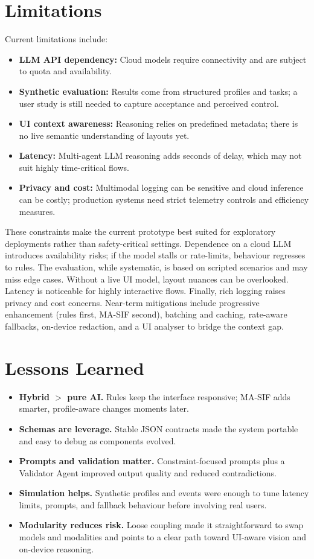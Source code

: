 \section{Limitations}
Current limitations include:
\begin{itemize}
    \item \textbf{LLM API dependency:} Cloud models require connectivity and are subject to quota and availability.
    \item \textbf{Synthetic evaluation:} Results come from structured profiles and tasks; a user study is still needed to capture acceptance and perceived control.
    \item \textbf{UI context awareness:} Reasoning relies on predefined metadata; there is no live semantic understanding of layouts yet.
    \item \textbf{Latency:} Multi-agent LLM reasoning adds seconds of delay, which may not suit highly time-critical flows.
    \item \textbf{Privacy and cost:} Multimodal logging can be sensitive and cloud inference can be costly; production systems need strict telemetry controls and efficiency measures.
\end{itemize}
These constraints make the current prototype best suited for exploratory deployments rather than safety-critical settings. Dependence on a cloud LLM introduces availability risks; if the model stalls or rate-limits, behaviour regresses to rules. The evaluation, while systematic, is based on scripted scenarios and may miss edge cases. Without a live UI model, layout nuances can be overlooked. Latency is noticeable for highly interactive flows. Finally, rich logging raises privacy and cost concerns. Near-term mitigations include progressive enhancement (rules first, MA-SIF second), batching and caching, rate-aware fallbacks, on-device redaction, and a UI analyser to bridge the context gap.

\section{Lessons Learned}
\begin{itemize}
    \item \textbf{Hybrid $>$ pure AI.} Rules keep the interface responsive; MA-SIF adds smarter, profile-aware changes moments later.
    \item \textbf{Schemas are leverage.} Stable JSON contracts made the system portable and easy to debug as components evolved.
    \item \textbf{Prompts and validation matter.} Constraint-focused prompts plus a Validator Agent improved output quality and reduced contradictions.
    \item \textbf{Simulation helps.} Synthetic profiles and events were enough to tune latency limits, prompts, and fallback behaviour before involving real users.
    \item \textbf{Modularity reduces risk.} Loose coupling made it straightforward to swap models and modalities and points to a clear path toward UI-aware vision and on-device reasoning.
\end{itemize}

